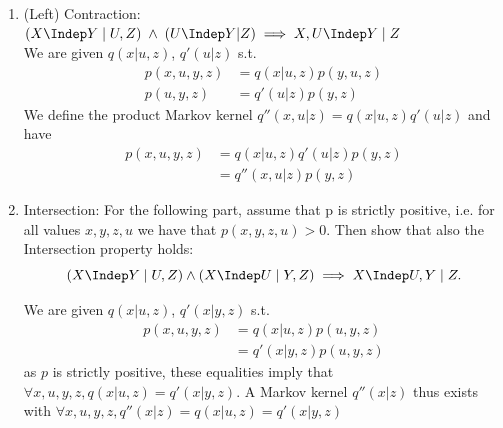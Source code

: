 \begin{enumerate}
\begin{ungradedsolution}
\begin{enumerate}
      We are given a $q(x,u|z)$ s.t. $p(x, u, y, z)=q(x, u|z)p(y, z)$. By marginalisation over $X$, $p(u, y, z)=q(u|z)p(y, z)$. By conditioning, we have a $q'(x|u,z)$ s.t. $q(x,u|z)=q'(x|u,z)q(u|z)$. Then:
      \begin{align*}
        p(x,u,y,z)
         & =q(x,u|z)p(y,z)        \\
         & =q'(x|u,z)q(u|z)p(y,z) \\
         & =q'(x|u,z)p(u,y,z)
      \end{align*}

      \item (Left) Contraction: $(X \Indep Y\; |\; U, Z) \; \land \; (U \Indep Y | Z) \implies X, U \Indep Y \; | \; Z$ \\

      We are given $q(x|u,z)$, $q'(u|z)$ s.t.
      \begin{align*}
        p(x, u, y, z) & =q(x|u,z)p(y, u, z) \\
        p(u, y, z)    & =q'(u|z)p(y, z)
      \end{align*}
      We define the product Markov kernel $q''(x,u|z)=q(x|u,z)q'(u|z)$ and have
      \begin{align*}
        p(x, u, y, z) & =q(x|u,z)q'(u|z)p(y, z) \\
                      & =q''(x,u|z)p(y, z)
      \end{align*}

      \item Intersection: For the following part, assume that p is strictly positive, i.e. for all values $x,y,z,u$ we have that $p(x, y, z, u) > 0$. Then show that also the Intersection property holds:
      $$(X \Indep Y \;|\;U,Z) \land (X \Indep U \; | \; Y,Z)  \implies  X \Indep U,Y \; | \; Z.$$

      We are given $q(x|u,z)$, $q'(x|y,z)$ s.t.
      \begin{align*}
        p(x, u, y, z) & =q(x|u,z)p(u, y, z) \\
                      & =q'(x|y,z)p(u,y, z)
      \end{align*}
      as $p$ is strictly positive, these equalities imply that $\forall x, u, y, z, q(x|u,z)=q'(x|y,z)$. A Markov kernel $q''(x|z)$ thus exists with $\forall x,u,y,z, q''(x|z)=q(x|u,z)=q'(x|y,z)$
    \end{enumerate}
  \end{ungradedsolution}


\end{enumerate}
